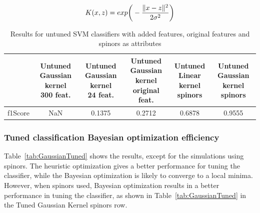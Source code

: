 \begin{equation}{\label{eqn:gaussianKernel}}
K (x,z) = exp \bigg(-\frac{\Vert x - z \Vert ^ 2}{2 \sigma^2} \bigg)
\end{equation}


\begin{table}[hbt!]
\caption{\label{tab:GaussianUntuned} Results for untuned SVM classifiers with added features, original features and spinors as attributes}
\centering
\begin{tabular}{lccccc}
\hline
& \makecell{Untuned \\ Gaussian kernel \\ 300 feat.} & \makecell{Untuned \\ Gaussian kernel \\ 24 feat.} & \makecell{Untuned \\ Gaussian kernel \\ original feat.} & \makecell{Untuned \\ Linear kernel \\ spinors}& \makecell{Untuned \\ Gaussian kernel \\ spinors }\\\hline
f1Score& NaN & 0.1375 & 0.2712 & 0.6878 & 0.9555\\
\hline
\end{tabular}
\end{table}

\subsubsection{Tuned classification Bayesian optimization efficiency}

Table~\ref{tab:GaussianTuned} shows the results, except for the simulations using spinors. The heuristic optimization gives a better performance for tuning the classifier, while the Bayesian optimization is likely to converge to a local minima. However, when spinors used, Bayesian optimization results in a better performance in tuning the classifier, as shown in Table~\ref{tab:GaussianTuned} in the Tuned Gaussian Kernel spinors row.  

